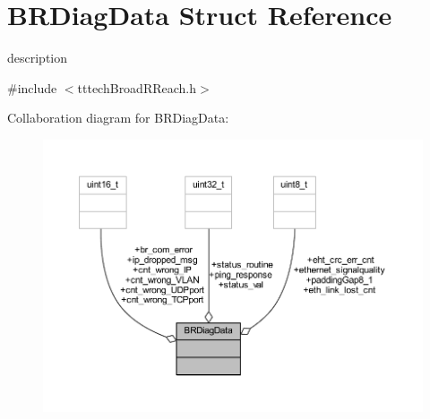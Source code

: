 \hypertarget{struct_b_r_diag_data}{}\section{B\+R\+Diag\+Data Struct Reference}
\label{struct_b_r_diag_data}


description  




{\ttfamily \#include $<$tttech\+Broad\+R\+Reach.\+h$>$}



Collaboration diagram for B\+R\+Diag\+Data\+:
\nopagebreak
\begin{figure}[H]
\begin{center}
\leavevmode
\includegraphics[width=350pt]{struct_b_r_diag_data__coll__graph}
\end{center}
\end{figure}
